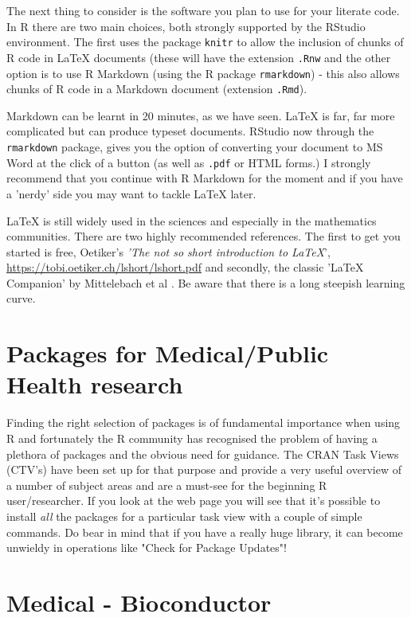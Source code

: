\documentclass[titlepage]{book}\usepackage{knitr}
\begin{document}
The next thing to consider is the software  you plan to use for your literate code.  In R there are two main choices, both strongly supported by the RStudio environment.  The first uses the package \texttt{knitr} to allow the inclusion of chunks of R code in \LaTeX{}  documents (these will have the extension \texttt{.Rnw} and the other option is to use R Markdown (using the R package \texttt{rmarkdown}) - this also allows chunks of R code in a Markdown document (extension \texttt{.Rmd}).

Markdown can be learnt in 20 minutes, as we have seen. \LaTeX{} is far, far more complicated but can produce typeset documents.  RStudio now through the \texttt{rmarkdown} package, gives you the option of converting your document to MS Word at the click of a button (as well as \texttt{.pdf} or HTML forms.)  I strongly recommend that you continue with R Markdown for the moment and if you have a 'nerdy' side you may want to tackle \LaTeX{} later.

\LaTeX{} is still widely used in the sciences and especially in the mathematics communities.  There are two highly recommended references.  The first to get you started is free, Oetiker's  \emph{'The not so short introduction to \LaTeX{}}', \href{https://tobi.oetiker.ch/lshort/lshort.pdf}{https://tobi.oetiker.ch/lshort/lshort.pdf} and secondly, the classic '\LaTeX{} Companion' by Mittelebach et al \cite{Mittelbach2004}.  Be aware that there is a long steepish learning curve.

\section{Packages for Medical/Public Health research}
Finding the right selection of packages is of fundamental importance when using R and fortunately the R community has recognised the problem of having a plethora of packages and the obvious need for guidance. The CRAN Task Views (CTV's) have been set up for that purpose and provide a very useful overview of a number of subject areas and are a must-see for the beginning R user/researcher. If you look at the web page you will see that it's possible to install \emph{all} the packages for a particular task view with a couple of simple commands. Do bear in mind that  if you have a really huge library, it can become unwieldy in operations like "Check for Package Updates"!

\section{Medical - Bioconductor}
\end{document}
